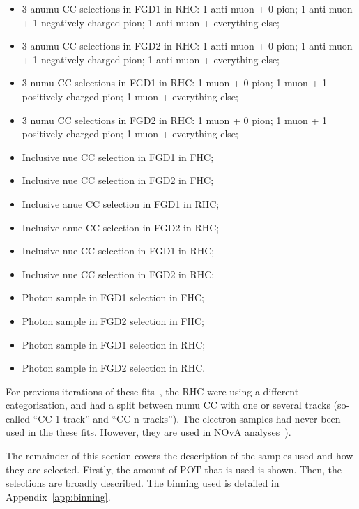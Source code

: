 \begin{itemize}[noitemsep,topsep=0pt]
\item 3 \Gls{anumu} \Gls{CC} selections in \Gls{FGD}1 in \Gls{RHC}: 1
  anti-muon + 0 pion; 1 anti-muon + 1 negatively charged pion; 1
  anti-muon + everything else;
\item 3 \Gls{anumu} \Gls{CC} selections in \Gls{FGD}2 in \Gls{RHC}: 1
  anti-muon + 0 pion; 1 anti-muon + 1 negatively charged pion; 1
  anti-muon + everything else;
\item 3 \Gls{numu} \Gls{CC} selections in \Gls{FGD}1 in \Gls{RHC}: 1
  muon + 0 pion; 1 muon + 1 positively charged pion; 1 muon +
  everything else;
\item 3 \Gls{numu} \Gls{CC} selections in \Gls{FGD}2 in \Gls{RHC}: 1
  muon + 0 pion; 1 muon + 1 positively charged pion; 1 muon +
  everything else;
\item Inclusive \Gls{nue} \Gls{CC} selection in \Gls{FGD}1 in
  \Gls{FHC};
\item Inclusive \Gls{nue} \Gls{CC} selection in \Gls{FGD}2 in
  \Gls{FHC};
\item Inclusive \Gls{anue} \Gls{CC} selection in \Gls{FGD}1 in
  \Gls{RHC};
\item Inclusive \Gls{anue} \Gls{CC} selection in \Gls{FGD}2 in
  \Gls{RHC};
\item Inclusive \Gls{nue} \Gls{CC} selection in \Gls{FGD}1 in
  \Gls{RHC};
\item Inclusive \Gls{nue} \Gls{CC} selection in \Gls{FGD}2 in
  \Gls{RHC};
\item Photon sample in \Gls{FGD}1 selection in \Gls{FHC};
\item Photon sample in \Gls{FGD}2 selection in \Gls{FHC};
\item Photon sample in \Gls{FGD}1 selection in \Gls{RHC};
\item Photon sample in \Gls{FGD}2 selection in \Gls{RHC}.
\end{itemize}

For previous iterations of these fits~\cite{TN324}, the \Gls{RHC} were
using a different categorisation, and had a split between \Gls{numu}
\Gls{CC} with one or several tracks (so-called ``\Gls{CC} 1-track''
and ``\Gls{CC} n-tracks''). The electron samples had never been used
in the these fits. However, they are used in \Gls{NOvA}
analyses~\cite{PhysRevLett.118.231801}).

The remainder of this section covers the description of the samples
used and how they are selected. Firstly, the amount of \Gls{POT} that
is used is shown. Then, the selections are broadly described. The
binning used is detailed in Appendix~\ref{app:binning}.


